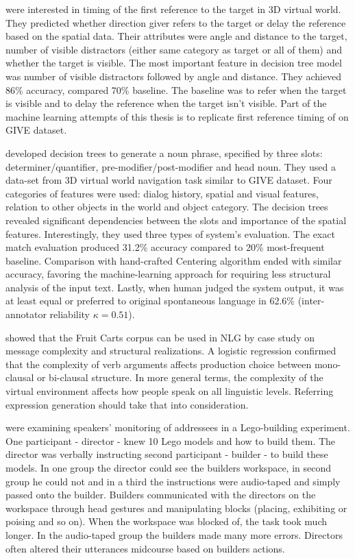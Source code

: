 \citet{stoia2006sentence} were interested in timing of the first reference to the target in 3D virtual world. They predicted whether direction giver refers to the target or delay the reference based on the spatial data. Their attributes were angle and distance to the target, number of visible distractors (either same category as target or all of them) and whether the target is visible. The most important feature in decision tree model was number of visible distractors followed by angle and distance. They achieved 86\% accuracy, compared 70\% baseline. The baseline was to refer when the target is visible and to delay the reference when the target isn't visible. Part of the machine learning attempts of this thesis is to replicate first reference timing of \citet{stoia2006sentence} on GIVE dataset.

\citet{stoia2006noun} developed decision trees to generate a noun phrase, specified by three slots: determiner/quantifier, pre-modifier/post-modifier and head noun. They used a data-set from 3D virtual world navigation task similar to GIVE dataset. Four categories of features were used: dialog history, spatial and visual features, relation to other objects in the world and object category. The decision trees revealed significant dependencies between the slots and importance of the spatial features. Interestingly, they used three types of system's evaluation. The exact match evaluation produced 31.2\% accuracy compared to 20\% most-frequent baseline. Comparison with hand-crafted Centering algorithm \citep{kibble2000integrated} ended with similar accuracy, favoring the machine-learning approach for requiring less structural analysis of the input text. Lastly, when human judged the system output, it was at least equal or preferred to original spontaneous language in 62.6\% (inter-annotator reliability $\kappa = 0.51$).

\citet{gallo2008production} showed that the Fruit Carts corpus can be used in NLG by case study on message complexity and structural realizations. A logistic regression confirmed that the complexity of verb arguments affects production choice between mono-clausal or bi-clausal structure. In more general terms, the complexity of the virtual environment affects how people speak on all linguistic levels. Referring expression generation should take that into consideration.

\citet{clark2004speaking} were examining speakers' monitoring of addressees in a Lego-building experiment. One participant - director - knew 10 Lego models and how to build them. The director was verbally instructing second participant - builder - to build these models. In one group the director could see the builders workspace, in second group he could not and in a third the instructions were audio-taped and simply passed onto the builder. Builders communicated with the directors on the workspace through head gestures and manipulating blocks (placing, exhibiting or poising and so on). When the workspace was blocked of, the task took much longer. In the audio-taped group the builders made many more errors. Directors often altered their utterances midcourse based on builders actions.

